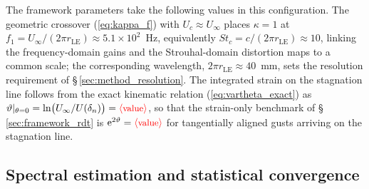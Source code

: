 \documentclass[lineno]{JFM-FLM_Au}
\newcommand{\tbd}[1]{\textcolor{red}{\ensuremath{\langle\mbox{\small #1}\rangle}}}
\begin{document}
The framework parameters take the following values in this configuration.
The geometric crossover (\ref{eq:kappa_f}) with $U_c \approx U_\infty$
places $\kappa = 1$ at
$f_1 = U_\infty/(2\pi r_{\mathrm{LE}}) \approx 5.1\times10^{2}$~Hz,
equivalently $St_c = c/(2\pi r_{\mathrm{LE}}) \approx 10$, linking the
frequency-domain gains and the Strouhal-domain distortion maps to a
common scale; the corresponding wavelength, $2\pi r_{\mathrm{LE}} \approx
40$~mm, sets the resolution requirement of
\S\,\ref{sec:method_resolution}. The integrated strain on the stagnation
line follows from the exact kinematic relation
(\ref{eq:vartheta_exact}) as
$\vartheta|_{\theta=0} = \ln\!\big(U_\infty/U(\delta_n)\big)
= \tbd{value}$,
so that the strain-only benchmark of \S\,\ref{sec:framework_rdt} is
$\mathrm{e}^{2\vartheta} = \tbd{value}$ for tangentially aligned gusts
arriving on the stagnation line.

\subsection{Spectral estimation and statistical convergence}
\label{sec:method_spectra}
\end{document}
